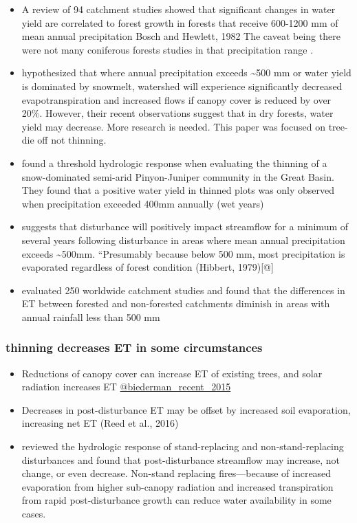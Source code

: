 \documentclass[
  number]{elsarticle}
\begin{document}
\begin{itemize}
\item
  A review of 94 catchment studies showed that significant changes in
  water yield are correlated to forest growth in forests that receive
  600-1200 mm of mean annual precipitation Bosch and Hewlett, 1982 The
  caveat being there were not many coniferous forests studies in that
  precipitation range \citep{bosch_review_1982}.
\item
  \citep{adams_ecohydrological_2012} hypothesized that where annual
  precipitation exceeds \textasciitilde500 mm or water yield is
  dominated by snowmelt, watershed will experience significantly
  decreased evapotranspiration and increased flows if canopy cover is
  reduced by over 20\%. However, their recent observations suggest that
  in dry forests, water yield may decrease. More research is needed.
  This paper was focused on tree-die off not thinning.
\item
  \citep{carroll_evaluating_2016} found a threshold hydrologic response
  when evaluating the thinning of a snow-dominated semi-arid
  Pinyon-Juniper community in the Great Basin. They found that a
  positive water yield in thinned plots was only observed when
  precipitation exceeded 400mm annually (wet years)
\item
  \citep{biederman_streamflow_2022} suggests that disturbance will
  positively impact streamflow for a minimum of several years following
  disturbance in areas where mean annual precipitation exceeds
  \textasciitilde500mm. ``Presumably because below 500 mm, most
  precipitation is evaporated regardless of forest condition (Hibbert,
  1979){[}@{]}
\item
  \citep{zhang_response_2001} evaluated 250 worldwide catchment studies
  and found that the differences in ET between forested and non-forested
  catchments diminish in areas with annual rainfall less than 500 mm
\end{itemize}

\subsubsection{thinning decreases ET in some
circumstances}\label{thinning-decreases-et-in-some-circumstances}

\begin{itemize}
\item
  Reductions of canopy cover can increase ET of existing trees, and
  solar radiation increases ET
  \href{Chen\%20et\%20al.,\%202005;\%20Bennett\%20et\%20al.,\%202018}{@biederman\_recent\_2015}
\item
  Decreases in post-disturbance ET may be offset by increased soil
  evaporation, increasing net ET (Reed et al., 2016)
\item
  \citep{goeking_forests_2020} reviewed the hydrologic response of
  stand-replacing and non-stand-replacing disturbances and found that
  post-disturbance streamflow may increase, not change, or even
  decrease. Non-stand replacing fires---because of increased evaporation
  from higher sub-canopy radiation and increased transpiration from
  rapid post-disturbance growth can reduce water availability in some
  cases.
\end{itemize}
\end{document}
